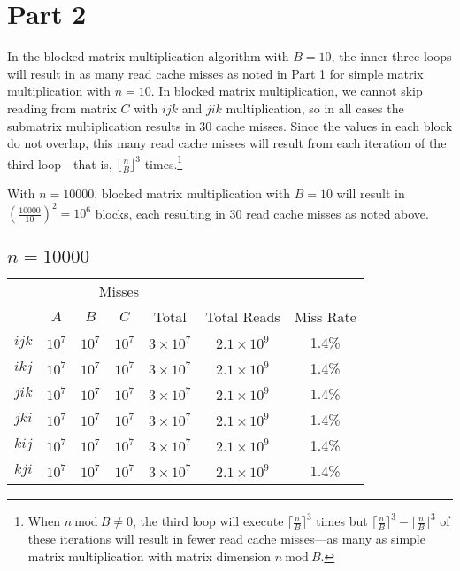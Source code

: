 \documentclass[12pt,letterpaper,oneside]{article}
\begin{document}
\newpage
\section*{Part 2}
In the blocked matrix multiplication algorithm with $B=10$, the inner three loops will result in as many read cache misses as noted in Part 1 for simple matrix multiplication with $n=10$.
In blocked matrix multiplication, we cannot skip reading from matrix $C$ with $ijk$ and $jik$ multiplication, so in all cases the submatrix multiplication results in 30 cache misses.
Since the values in each block do not overlap, this many read cache misses will result from each iteration of the third loop---that is, $\lfloor \frac{n}{B}\rfloor^3$ times.\footnote
{When $n\ \textrm{mod}\ B\ne0$, the third loop will execute $\lceil\frac{n}{B}\rceil^3$ times but $\lceil\frac{n}{B}\rceil^3-\lfloor\frac{n}{B}\rfloor^3$ of these iterations will result in fewer read cache misses---as many as simple matrix multiplication with matrix dimension $n\ \textrm{mod}\ B$.}

With $n=10000$, blocked matrix multiplication with $B=10$ will result in $(\frac{10000}{10})^2=10^6$ blocks, each resulting in 30 read cache misses as noted above.

\begin{center}
	\subsection*{$n=10000$}
	\begin{tabular}{c | c c c c | c c}
		& \multicolumn{4}{c|}{Misses} &  & \\
		& $A$ & $B$ & $C$ & Total & Total Reads & Miss Rate \\
		\hline
		$ijk$ & $10^7$ & $10^7$ & $10^7$ & $3\times10^7$ & $2.1\times10^9$ & 1.4\% \\
		$ikj$ & $10^7$ & $10^7$ & $10^7$ & $3\times10^7$ & $2.1\times10^9$ & 1.4\% \\
		$jik$ & $10^7$ & $10^7$ & $10^7$ & $3\times10^7$ & $2.1\times10^9$ & 1.4\% \\
		$jki$ & $10^7$ & $10^7$ & $10^7$ & $3\times10^7$ & $2.1\times10^9$ & 1.4\% \\
		$kij$ & $10^7$ & $10^7$ & $10^7$ & $3\times10^7$ & $2.1\times10^9$ & 1.4\% \\
		$kji$ & $10^7$ & $10^7$ & $10^7$ & $3\times10^7$ & $2.1\times10^9$ & 1.4\% \\
	\end{tabular}
\end{center}
\end{document}
